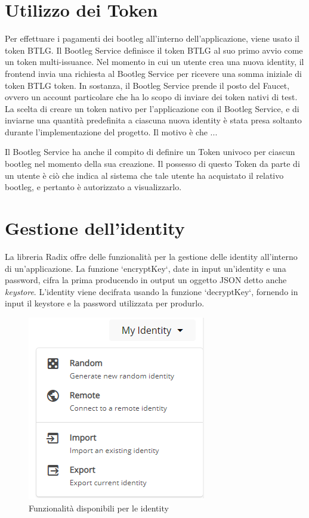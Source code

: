 \section{Utilizzo dei Token}

Per effettuare i pagamenti dei bootleg all'interno dell'applicazione, viene usato il token BTLG. Il Bootleg Service definisce il token BTLG al suo primo avvio come un token multi-issuance. Nel momento in cui un utente crea una nuova identity, il frontend invia una richiesta al Bootleg Service per ricevere una somma iniziale di token BTLG token. In sostanza, il Bootleg Service prende il posto del Faucet, ovvero un account particolare che ha lo scopo di inviare dei token nativi di test. La scelta di creare un token nativo per l'applicazione con il Bootleg Service, e di inviarne una quantità predefinita a ciascuna nuova identity è stata presa soltanto durante l'implementazione del progetto. Il motivo è che ...

Il Bootleg Service ha anche il compito di definire un Token univoco per ciascun bootleg nel momento della sua creazione. Il possesso di questo Token da parte di un utente è ciò che indica al sistema che tale utente ha acquistato il relativo bootleg, e pertanto è autorizzato a visualizzarlo.

\section{Gestione dell'identity}

La libreria Radix offre delle funzionalità per la gestione delle identity all'interno di un'applicazione. La funzione `encryptKey`, date in input un'identity e una password, cifra la prima producendo in output un oggetto JSON detto anche \textit{keystore}. L'identity viene decifrata usando la funzione `decryptKey`, fornendo in input il keystore e la password utilizzata per produrlo.

\begin{figure}[H]
    \centering
    \includegraphics{images/application/identity-manage.png}
    \caption{Funzionalità disponibili per le identity}
    \label{fig:identity_manage}
\end{figure}

